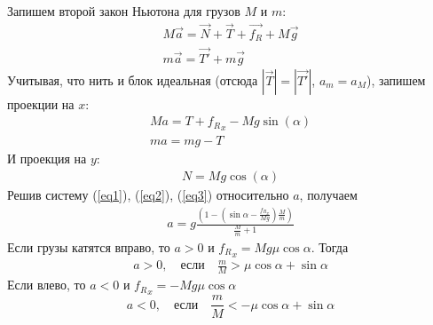 \documentclass[a5paper,10pt]{article}\usepackage[usenames,dvipsnames]{color}\usepackage{extsizes,cmap,graphicx,misccorr,indentfirst,makecell,multirow,ulem,geometry,amssymb,amsfonts,amsmath,amsthm,titlesec,float,fancyhdr,wrapfig,tikz}\usepackage[T2A]{fontenc}\usepackage[utf8x]{inputenc}\usepackage[english, russian]{babel}\usetikzlibrary{decorations.pathreplacing,decorations.pathmorphing,patterns,calc,scopes,arrows,through}\graphicspath{{img/}}\linespread{1.3}\frenchspacing\geometry{left=1cm, right=1cm, top=2cm, bottom=1cm, bindingoffset=0cm}\pagestyle{fancy}\fancyhead{}\fancyhead[R]{Сарафанов Ф.Г.}
\begin{document}
\def\N{\vec{N}}
\def\T{\vec{T}}
\def\t{\vec{T'}}
\def\F{\vec{f_R}}
\def\P{M\vec{g}}
\def\p{m\vec{g}}

Запишем второй закон Ньютона для грузов $M$ и $m$: 
\begin{gather}
	M\vec{a}=\N+\T+\F+\P\\
	m\vec{a}=\t+\p
\end{gather}
Учитывая, что нить и блок идеальная  (отсюда $|\T|=|\t|$, $a_m=a_M$), запишем проекции на $x$: 
\begin{gather}
	\label{eq1}Ma=T+{f_R}_x-Mg\sin(\alpha)\\
	\label{eq2}ma=mg-T
\end{gather}
И проекция на $y$:
\begin{gather}
	\label{eq3}N=Mg\cos(\alpha)
\end{gather}
Решив систему (\ref{eq1}), (\ref{eq2}), (\ref{eq3}) относительно $a$, получаем
\begin{gather}
	\label{eq4}a=g\frac{(1-(\sin{\alpha}-\frac{{f_R}_x}{Mg})\frac{M}{m})}{\frac{M}{m}+1}
\end{gather}
Если грузы катятся вправо, то $a>0$ и ${f_R}_x=Mg\mu\cos\alpha$. Тогда
\begin{gather}
	a>0, \hspace{1em}\text{если}\hspace{1em} \frac{m}{M}>\mu\cos{\alpha}+\sin{\alpha}
\end{gather}
Если влево, то $a<0$ и ${f_R}_x=-Mg\mu\cos\alpha$
\begin{equation}
        a<0, \hspace{1em}\text{если}\hspace{1em} \frac{m}{M}<-\mu\cos{\alpha}+\sin{\alpha}
\end{equation}
\end{document}
